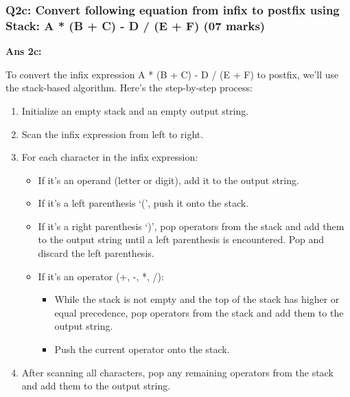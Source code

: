 \hypertarget{q2c-convert-following-equation-from-infix-to-postfix-using-stack-a-b-c---d-e-f-07-marks}{%
\subsubsection{Q2c: Convert following equation from infix to postfix
using Stack: A * (B + C) - D / (E + F) (07
marks)}\label{q2c-convert-following-equation-from-infix-to-postfix-using-stack-a-b-c---d-e-f-07-marks}}

\textbf{Ans 2c:}

To convert the infix expression A * (B + C) - D / (E + F) to postfix,
we'll use the stack-based algorithm. Here's the step-by-step process:

\begin{enumerate}
\def\labelenumi{\arabic{enumi}.}
\tightlist
\item
  Initialize an empty stack and an empty output string.
\item
  Scan the infix expression from left to right.
\item
  For each character in the infix expression:

  \begin{itemize}
  \tightlist
  \item
    If it's an operand (letter or digit), add it to the output string.
  \item
    If it's a left parenthesis `(', push it onto the stack.
  \item
    If it's a right parenthesis `)', pop operators from the stack and
    add them to the output string until a left parenthesis is
    encountered. Pop and discard the left parenthesis.
  \item
    If it's an operator (+, -, *, /):

    \begin{itemize}
    \tightlist
    \item
      While the stack is not empty and the top of the stack has higher
      or equal precedence, pop operators from the stack and add them to
      the output string.
    \item
      Push the current operator onto the stack.
    \end{itemize}
  \end{itemize}
\item
  After scanning all characters, pop any remaining operators from the
  stack and add them to the output string.
\end{enumerate}

